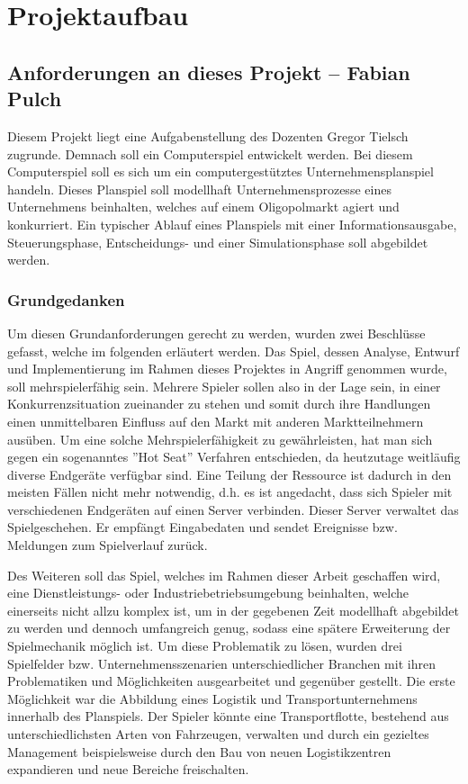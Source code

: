 \chapter{Projektaufbau}


\section{Anforderungen an dieses Projekt -- Fabian Pulch}
Diesem Projekt liegt eine Aufgabenstellung des Dozenten Gregor Tielsch zugrunde. Demnach soll ein Computerspiel entwickelt werden. Bei diesem Computerspiel soll es sich um ein computergestütztes Unternehmensplanspiel handeln. Dieses Planspiel soll modellhaft Unternehmensprozesse eines Unternehmens beinhalten, welches auf einem Oligopolmarkt agiert und konkurriert. Ein typischer Ablauf eines Planspiels mit einer Informationsausgabe, Steuerungsphase, Entscheidungs- und einer Simulationsphase soll abgebildet werden.
\subsection{Grundgedanken}
Um diesen Grundanforderungen gerecht zu werden, wurden zwei Beschlüsse gefasst, welche im folgenden erläutert werden. Das Spiel, dessen Analyse, Entwurf und Implementierung im Rahmen dieses Projektes in Angriff genommen wurde, soll mehrspielerfähig sein. Mehrere Spieler sollen also in der Lage sein, in einer Konkurrenzsituation zueinander zu stehen und somit durch ihre Handlungen einen unmittelbaren Einfluss auf den Markt mit anderen Marktteilnehmern ausüben. Um eine solche Mehrspielerfähigkeit zu gewährleisten, hat man sich gegen ein sogenanntes ''Hot Seat'' Verfahren entschieden, da heutzutage weitläufig diverse Endgeräte verfügbar sind. Eine Teilung der Ressource ist dadurch in den meisten Fällen nicht mehr notwendig, d.h. es ist angedacht, dass sich Spieler mit verschiedenen Endgeräten auf einen Server verbinden. Dieser Server verwaltet das Spielgeschehen. Er empfängt Eingabedaten und sendet Ereignisse bzw. Meldungen zum Spielverlauf zurück.

Des Weiteren soll das Spiel, welches im Rahmen dieser Arbeit geschaffen wird, eine Dienstleistungs- oder Industriebetriebsumgebung beinhalten, welche einerseits nicht allzu komplex ist, um in der gegebenen Zeit modellhaft abgebildet zu werden und dennoch umfangreich genug, sodass eine spätere Erweiterung der Spielmechanik möglich ist. Um diese Problematik zu lösen, wurden drei Spielfelder bzw. Unternehmensszenarien unterschiedlicher Branchen mit ihren Problematiken und Möglichkeiten ausgearbeitet und gegenüber gestellt. Die erste Möglichkeit war die Abbildung eines Logistik und Transportunternehmens innerhalb des Planspiels. Der Spieler könnte eine Transportflotte, bestehend aus unterschiedlichsten Arten von Fahrzeugen, verwalten und durch ein gezieltes Management beispielsweise durch den Bau von neuen Logistikzentren expandieren und neue Bereiche freischalten.

